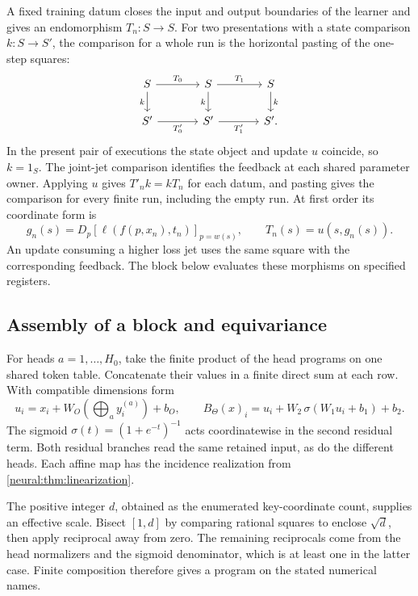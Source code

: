 \documentclass[11pt,a4paper]{article}
\theoremstyle{definition}
\theoremstyle{remark}\newaliascnt{remark}{theorem}
\numberwithin{equation}{section}
\begin{document}
A fixed training datum closes the input and output boundaries of the learner and gives an endomorphism \(T_n:S\to S\). For two presentations with a state comparison \(k:S\to S'\), the comparison for a whole run is the horizontal pasting of the one-step squares:
\[
\begin{tikzcd}[column sep=large]
 S\arrow[r,"T_0"]\arrow[d,"k"']&S\arrow[r,"T_1"]\arrow[d,"k"']&S\arrow[d,"k"]\\
 S'\arrow[r,"T'_0"']&S'\arrow[r,"T'_1"']&S' .
\end{tikzcd}
\]
In the present pair of executions the state object and update \(u\) coincide, so \(k=1_S\). The joint-jet comparison identifies the feedback at each shared parameter owner. Applying \(u\) gives \(T'_n k=kT_n\) for each datum, and pasting gives the comparison for every finite run, including the empty run. At first order its coordinate form is
\[
 g_n(s)=D_p[\ell(f(p,x_n),t_n)]_{p=w(s)},\qquad T_n(s)=u(s,g_n(s)).
\]
An update consuming a higher loss jet uses the same square with the corresponding feedback. The block below evaluates these morphisms on specified registers.

\subsection{Assembly of a block and equivariance}

For heads \(a=1,\ldots,H_0\), take the finite product of the head programs on one shared token table. Concatenate their values in a finite direct sum at each row. With compatible dimensions form
\[
 u_i=x_i+W_O\!\left(\bigoplus_a y_i^{(a)}\right)+b_O,\qquad
 B_\Theta(x)_i=u_i+W_2\,\sigma(W_1u_i+b_1)+b_2 .
\]
The sigmoid $\sigma(t)=(1+e^{-t})^{-1}$ acts coordinatewise in the second residual term. Both residual branches read the same retained input, as do the different heads. Each affine map has the incidence realization from \cref{neural:thm:linearization}.

The positive integer $d$, obtained as the enumerated key-coordinate count, supplies an effective scale. Bisect $[1,d]$ by comparing rational squares to enclose $\sqrt d$, then apply reciprocal away from zero. The remaining reciprocals come from the head normalizers and the sigmoid denominator, which is at least one in the latter case. Finite composition therefore gives a program on the stated numerical names.
\end{document}
